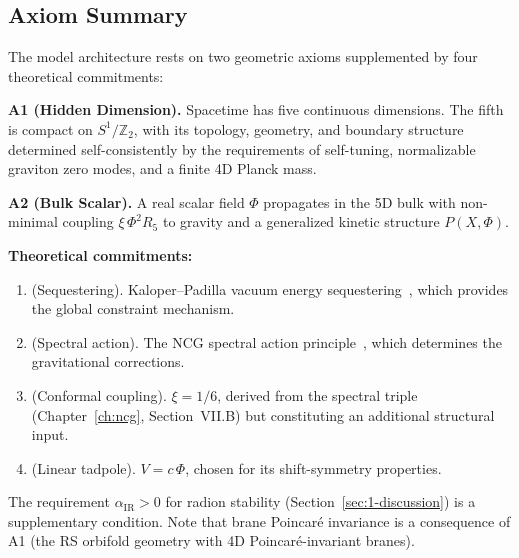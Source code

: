 \subsection{Axiom Summary}
\label{sec:1-axioms}

The model architecture rests on two geometric axioms supplemented by four theoretical commitments:

\medskip
\noindent\textbf{A1 (Hidden Dimension).} Spacetime has five continuous dimensions. The fifth is compact on $S^1/\mathbb{Z}_2$, with its topology, geometry, and boundary structure determined self-consistently by the requirements of self-tuning, normalizable graviton zero modes, and a finite 4D Planck mass.

\medskip
\noindent\textbf{A2 (Bulk Scalar).} A real scalar field $\Phi$ propagates in the 5D bulk with non-minimal coupling $\xi\,\Phi^2 R_5$ to gravity and a generalized kinetic structure $P(X, \Phi)$.

\medskip
\noindent\textbf{Theoretical commitments:}
\begin{enumerate}
\item[\textbf{A3}] (Sequestering). Kaloper--Padilla vacuum energy sequestering~\cite{ch1:kaloper14}, which provides the global constraint mechanism.
\item[\textbf{A4}] (Spectral action). The NCG spectral action principle~\cite{ch1:chamseddine97}, which determines the gravitational corrections.
\item[\textbf{A5}] (Conformal coupling). $\xi = 1/6$, derived from the spectral triple (Chapter~\ref{ch:ncg}, Section~VII.B) but constituting an additional structural input.
\item[\textbf{A6}] (Linear tadpole). $V = c\,\Phi$, chosen for its shift-symmetry properties.
\end{enumerate}
The requirement $\alpha_{\mathrm{IR}} > 0$ for radion stability (Section~\ref{sec:1-discussion}) is a supplementary condition.
Note that brane Poincar\'{e} invariance is a consequence of A1 (the RS orbifold geometry with 4D Poincar\'{e}-invariant branes).


